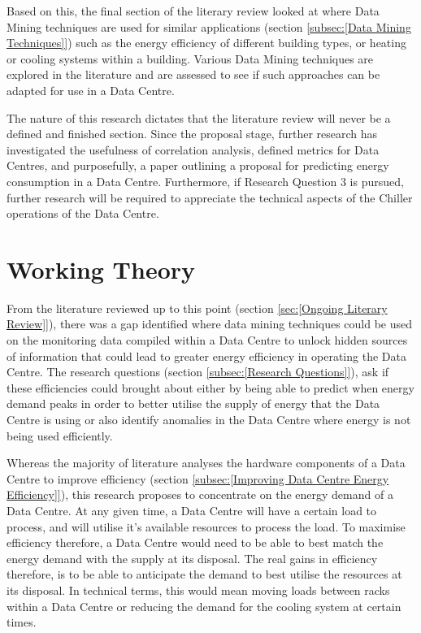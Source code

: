 \documentclass[12pt]{scrartcl}
\begin{document}
Based on this, the final section of the literary review looked at where Data Mining techniques are used for similar applications (section \ref{subsec:[Data Mining Techniques]}) such as the energy efficiency of different building types, or heating or cooling systems within a building. Various Data Mining techniques are explored in the literature and are assessed to see if such approaches can be adapted for use in a Data Centre.   

The nature of this research dictates that the literature review will never be a defined and finished section. Since the proposal stage, further research has investigated the usefulness of correlation analysis, defined metrics for Data Centres, and purposefully, a paper outlining a proposal for predicting energy consumption in a Data Centre. Furthermore, if Research Question 3 is pursued, further research will be required to appreciate the technical aspects of the Chiller operations of the Data Centre. 

\section{Working Theory}
\label{sec:[Working Theory]}
From the literature reviewed up to this point (section \ref{sec:[Ongoing Literary Review]}), there was a gap identified where data mining techniques could be used on the monitoring data compiled within a Data Centre to unlock hidden sources of information that could lead to greater energy efficiency in operating the Data Centre. The research questions (section \ref{subsec:[Research Questions]}), ask if these efficiencies could brought about either by being able to predict when energy demand peaks in order to better utilise the supply of energy that the Data Centre is using or also identify anomalies in the Data Centre where energy is not being used efficiently. 

Whereas the majority of literature analyses the hardware components of a Data Centre to improve efficiency (section \ref{subsec:[Improving Data Centre Energy Efficiency]}), this research proposes to concentrate on the energy demand of a Data Centre. At any given time, a Data Centre will have a certain load to process, and will utilise it's available resources to process the load. To maximise efficiency therefore, a Data Centre would need to be able to best match the energy demand with the supply at its disposal. The real gains in efficiency therefore, is to be able to anticipate the demand to best utilise the resources at its disposal. In technical terms, this would mean moving loads between racks within a Data Centre or reducing the demand for the cooling system at certain times. 
\end{document}
